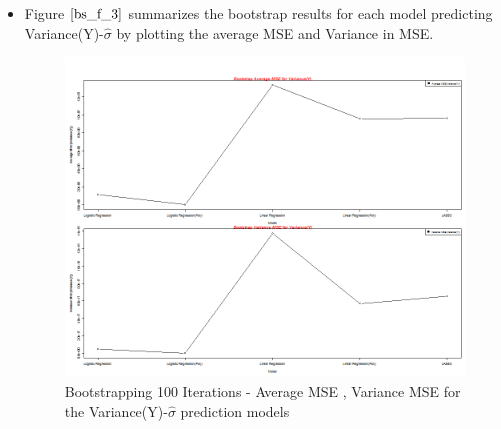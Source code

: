 \documentclass[twoside,12pt]{article}
\begin{document}
\begin{itemize}
\FloatBarrier
\item
Figure $\eqref{bs_f_3}$ summarizes the bootstrap results for each model predicting Variance(Y)-$\hat{\sigma}$ by plotting the average MSE and Variance in MSE. 
\begin{figure}[!htbp]
	\centering
	\includegraphics[scale=.50]{images/mt_bootstrap_vhat_mse_var_plot.png} 
	\caption{Bootstrapping 100 Iterations - Average MSE , Variance MSE for the Variance(Y)-$\hat{\sigma}$ prediction models}
	\label{bs_f_3}
\end{figure}


\end{itemize}


\FloatBarrier
\end{document}
